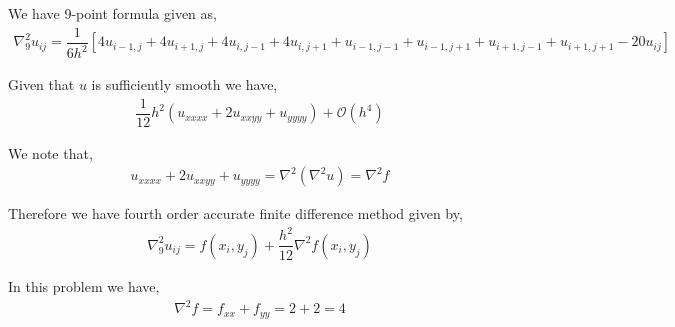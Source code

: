 \documentclass[10pt]{article}
\begin{document}
\begin{solution}[Solution]

We have 9-point formula given as,
\begin{align*}
    \nabla_9^2 u_{ij} = \dfrac{1}{6h^2} \left[ 4 u_{i-1,j} + 4u_{i+1,j} + 4u_{i,j-1}+4u_{i,j+1}+u_{i-1,j-1}+u_{i-1,j+1}+u_{i+1,j-1}+u_{i+1,j+1}-20u_{ij} \right]
\end{align*}

Given that \( u \) is sufficiently smooth we have,
\begin{align*}
    \dfrac{1}{12} h^2 (u_{xxxx}+2u_{xxyy}+u_{yyyy}) + \mathcal{O}(h^4)
\end{align*}

We note that,
\begin{align*}
    u_{xxxx}+2u_{xxyy}+u_{yyyy} = \nabla^2(\nabla^2u) = \nabla^2 f
\end{align*}

Therefore we have fourth order accurate finite difference method given by,
\begin{align*}
    \nabla_9^2 u_{ij} = f(x_i,y_j) + \dfrac{h^2}{12} \nabla^2 f(x_i,y_j)
\end{align*}

In this problem we have,
\begin{align*}
    \nabla^2 f = f_{xx} + f_{yy} = 2+2 =4
\end{align*}


\end{solution}
\end{document}
